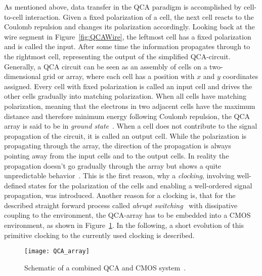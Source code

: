 As mentioned above, data transfer in the QCA paradigm is accomplished by cell-to-cell interaction. Given a fixed polarization of a cell, the next cell reacts to the Coulomb repulsion and changes its polarization accordingly. Looking back at the wire segment in Figure~\ref{fig:QCAWire}, the leftmost cell has a fixed polarization and is called the input. After some time the information propagates through to the rightmost cell, representing the output of the simplified QCA-circuit. Generally, a QCA circuit can be seen as an assembly of cells on a two-dimensional grid or array, where each cell has a position with $x$ and $y$ coordinates assigned. Every cell with fixed polarization is called an input cell and drives the other cells gradually into matching polarization. When all cells have matching polarization, meaning that the electrons in two adjacent cells have the maximum distance and therefore minimum energy following Coulomb repulsion, the QCA array is said to be in \emph{ground state}~\cite{lent1997device}. When a cell does not contribute to the signal propagation of the circuit, it is called an output cell. While the polarization is propagating through the array, the direction of the propagation is always pointing away from the input cells and to the output cells. In reality the propagation doesn't go gradually through the array but shows a quite unpredictable behavior~\cite{lent1994quantum}. This is the first reason, why a \textit{clocking}, involving well-defined states for the polarization of the cells and enabling a well-ordered signal propagation, was introduced. Another reason for a clocking is, that for the described straight forward process called \emph{abrupt switching}~\cite{lent1997device} with dissipative coupling to the environment, the QCA-array has to be embedded into a CMOS environment, as shown in Figure~\ref{fig:QCA_array}. In the following, a short evolution of this primitive clocking to the currently used clocking is described.

\begin{figure}
	\centering
	\texttt{[image: QCA\_array]}
	\caption{Schematic of a combined QCA and CMOS system~\cite{lent1994quantum}.} 
	\label{fig:QCA_array}
\end{figure}

